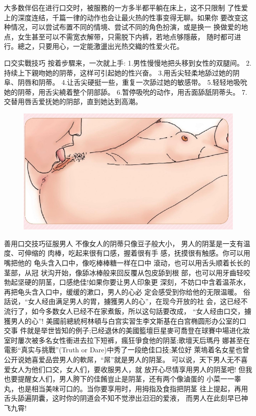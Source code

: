 \documentclass[12pt,UTF8]{ctexbook}
\begin{document}
大多数伴侣在进行口交时，被服務的一方多半都平躺在床上，这不只限制
了性爱上的深度连结，千篇一律的动作也会让最火热的性事变得无聊。如果你
要改变这种情况，可以尝试布置不同的情境、尝试不同的角色扮演，或是换一
换做爱的地点，女生甚至可以不需宽衣解带，只需脱下内裤，若地点够隱蔽，
随时都可进行。總之，只要用心，一定能激盪出光热交織的性爱火花。

口交实戰技巧
按着步驟来，一次就上手:
1.男性慢慢地把头移到女性的双腿间。
2.持续上下親吻她的阴蒂，这样可引起她的性兴奋。
3.用舌尖轻柔地舔过她的阴阜、阴唇和阴蒂。
4.让舌尖硬挺一些，重复一次舔过她的敏感带。
5.轻轻地吸吮她的阴蒂，用舌尖繞着整个阴部舔。
6.暂停吸吮的动作，用舌面舔舐阴蒂头。
7.交替用唇舌爱抚她的阴部，直到她达到高潮。

\begin{figure}[htbp]
	\centering
	\includegraphics[width=0.7\linewidth]{19}
	\caption{}
	\label{fig:1}
\end{figure}

善用口交技巧征服男人
不像女人的阴蒂只像豆子般大小，
男人的阴茎是一支有温度、可伸缩的
肉棒，吃起来很有口感，握着很有手
感，抚摸很有触感。你可以用嘴把他的
龟头含入口中，像吃棒棒糖一样在口中
滾动，也可以用舌头顺着长长的茎部，从冠
状沟开始，像舔冰棒般来回反覆从包皮舔到根
部，也可以用牙齒轻咬勃起坚硬的阴茎，口感绝佳!如果你要让男人印象更
深刻，不妨口中含着温茶水，再把龟头含入口中，缓缓的漱口，男人的心必
定会感受到你给他的无限温暖。
俗話说，“女人经由满足男人的胃，擄獲男人的心”，在现今开放的社
会，这已经不流行了，如今多数女人已经不在家煮飯，所以这句話要改成，
“女人经由口交，擄獲男人的心”!
美國前總統柯林頓与白宫实習生李文斯基在白宫椭圆形办公室的口交事
件就是举世皆知的例子;已经退休的美國籃壇巨星麥可喬登在球賽中場进化妝室时屢次被多名女性衝进去拉下短裤，瘋狂爭食他的阴茎;歌壇天后瑪丹
娜甚至在電影“真实与挑戰”(Truth or Dare)中秀了一段绝佳口技;某位好
萊塢着名女星也曾公开说她喜爱品尝男人的軟屌，“屌”就是男人的阴茎。
可以说，天下男人无不喜爱女人为他们口交，女人们，要收服男人，就
放开心尽情享用男人的阴茎吧!
但我也要提醒女人们，男人胯下的佳餚豈止是阴茎，还有两个像滷蛋的
小菜一一睾丸，也是相当美味可口的。当你要享用时，用拇指及食指把阴茎
往上提起，再用舌头舔遍阴囊，这时你的阴道会不知不觉滲出汨汨的爱液，
而男人在此刻早已神飞九霄!
\end{document}
